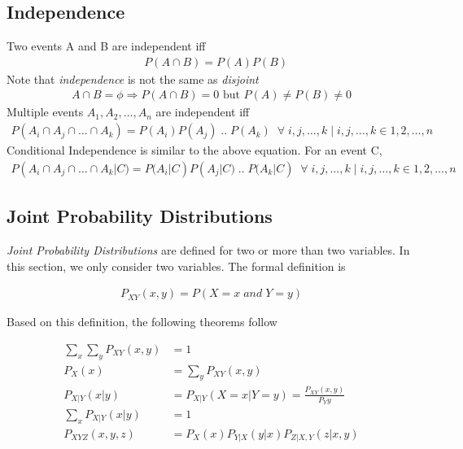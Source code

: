 \documentclass[11pt, a4paper]{article}
\begin{document}
    \subsection{Independence}
    Two events A and B are independent iff
    \begin{align*}
        &P(A \cap B) = P(A) P(B)
    \end{align*}
    Note that \emph{independence} is not the same as \emph{disjoint}
    \begin{align*}
    A \cap B = \phi \Rightarrow P(A \cap B) = 0 \text{ but } P(A) \neq P(B) \neq 0
    \end{align*}
    Multiple events $A_{1}, A_{2}, \ldots , A_{n}$ are independent iff
    \begin{align*}
        P(A_{i} \cap A_{j} \cap \ldots \cap A_{k}) = P(A_{i}) P(A_{j}) \;..\; P(A_{k}) \;\;\forall\;i,j,\ldots,k \;|\; i,j,\ldots,k \in {1,2,\ldots,n}
    \end{align*}
    Conditional Independence is similar to the above equation. For an event C,
    \begin{align*}
        P(A_{i} \cap A_{j} \cap \ldots \cap A_{k} | C) = P(A_{i}|C) P(A_{j}|C) \;..\; P(A_{k}|C) \;\;\forall\;i,j,\ldots,k \;|\; i,j,\ldots,k \in {1,2,\ldots,n}
    \end{align*}
    
    \subsection{Joint Probability Distributions}
    \emph{Joint Probability Distributions} are defined for two or more than two variables. In this section, we only consider two variables. The formal definition is

    \begin{align*}
        P_{XY}(x, y) = P(X = x \;and\; Y = y)
    \end{align*}

    Based on this definition, the following theorems follow

    \begin{align*}
        \sum_{x} \sum_{y} P_{XY}(x,y) &= 1 \\
        P_{X}(x) &= \sum_{y} P_{XY}(x,y) \tag*{Marginal Probability} \\
        P_{X|Y}(x|y) &= P_{X|Y}(X=x|Y=y) = \frac{P_{XY}(x,y)}{P_{Y}{y}} \\
        \sum_{x} P_{X|Y}(x|y) &= 1 \tag*{Since Y is fixed and we sum over all X's} \\
        P_{XYZ}(x,y,z) &= P_{X}(x) P_{Y|X}(y|x) P_{Z|X,Y}(z|x,y) \tag*{Chain Rule}
    \end{align*}
\end{document}
